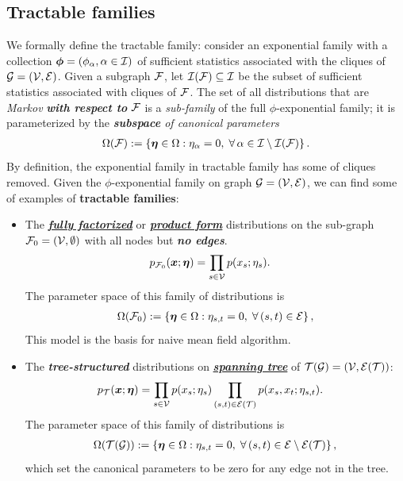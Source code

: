 \documentclass[11pt]{article}
\begin{document}
\subsection{Tractable families}
We formally define the tractable family: consider an exponential family with a collection $\boldsymbol{\phi} = (\phi_{\alpha}, \alpha \in {\mathcal I})$ of sufficient statistics associated with the cliques of ${\mathcal G} = ({\mathcal V}, {\mathcal E})$. Given a subgraph ${\mathcal F}$, let ${\mathcal I}({\mathcal F}) \subseteq {\mathcal I}$ be the subset of sufficient statistics associated with cliques of ${\mathcal F}$. The set of all distributions that are \emph{Markov} \textbf{\emph{with respect to}} ${\mathcal F}$ is a \emph{sub-family} of the full $\phi$-exponential family; it is parameterized by the \emph{\textbf{subspace} of canonical parameters}
\begin{align}
\Omega({\mathcal F}) := \left\{\boldsymbol{\eta} \in \Omega: \eta_{\alpha} = 0, \; \forall\, \alpha \in {\mathcal I} \setminus {\mathcal I}({\mathcal F})\right\}. \label{eqn: mean_field_param_space}
\end{align} By definition, the exponential family in tractable family has some of cliques removed. Given the $\phi$-exponential family on graph ${\mathcal G} = ({\mathcal V}, {\mathcal E})$, we can find some of examples of \textbf{tractable families}:
\begin{itemize}
\item The \underline{\emph{\textbf{fully factorized}}} or \underline{\emph{\textbf{product form}}} distributions on the sub-graph ${\mathcal F}_{0} = ({\mathcal V}, \emptyset)$ with all nodes but \emph{\textbf{no edges}}. 
\begin{align}
p_{{\mathcal F}_{0}}(\boldsymbol{x}; \boldsymbol{\eta}) &= \prod_{s\in {\mathcal V}}p(x_s; \eta_s). \label{eqn: mean_field_fully_factorized}
\end{align} The parameter space of this family of distributions is
\begin{align}
\Omega({\mathcal F}_{0}) := \left\{\boldsymbol{\eta} \in \Omega: \eta_{s, t} = 0, \; \forall\, (s, t) \in {\mathcal E}\right\}, \label{eqn: mean_field_param_space_prod_dist}
\end{align} This model is the basis for naive mean field algorithm.

\item The \textbf{\emph{tree-structured}} distributions on \underline{\emph{\textbf{spanning tree}}} of ${\mathcal T}({\mathcal G}) = ({\mathcal V}, {\mathcal E}({\mathcal T}))$:
\begin{align}
p_{{\mathcal T}}(\boldsymbol{x}; \boldsymbol{\eta}) &= \prod_{s\in {\mathcal V}}p(x_s; \eta_s)\prod_{(s,t)\in {\mathcal E}({\mathcal T})}p(x_s, x_t; \eta_{s, t}). \label{eqn: mean_field_spanning_tree}
\end{align}
The parameter space of this family of distributions is
\begin{align}
\Omega({\mathcal T}({\mathcal G})) := \left\{\boldsymbol{\eta} \in \Omega: \eta_{s, t} = 0, \; \forall\, (s, t) \in {\mathcal E} \setminus {\mathcal E}({\mathcal T})\right\}, \label{eqn: mean_field_param_space_spanning_tree}
\end{align} which set the canonical parameters to be zero for any edge not in the tree.
\end{itemize}
\end{document}
